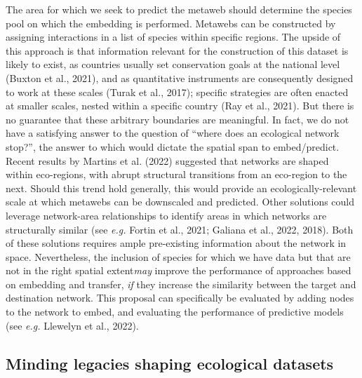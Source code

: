 \documentclass[11pt]{article}
\begin{document}
The area for which we seek to predict the metaweb should determine the
species pool on which the embedding is performed. Metawebs can be
constructed by assigning interactions in a list of species within
specific regions. The upside of this approach is that information
relevant for the construction of this dataset is likely to exist, as
countries usually set conservation goals at the national level (Buxton
et al., 2021), and as quantitative instruments are consequently designed
to work at these scales (Turak et al., 2017); specific strategies are
often enacted at smaller scales, nested within a specific country (Ray
et al., 2021). But there is no guarantee that these arbitrary boundaries
are meaningful. In fact, we do not have a satisfying answer to the
question of ``where does an ecological network stop?'', the answer to
which would dictate the spatial span to embed/predict. Recent results by
Martins et al. (2022) suggested that networks are shaped within
eco-regions, with abrupt structural transitions from an eco-region to
the next. Should this trend hold generally, this would provide an
ecologically-relevant scale at which metawebs can be downscaled and
predicted. Other solutions could leverage network-area relationships to
identify areas in which networks are structurally similar (see
\emph{e.g.} Fortin et al., 2021; Galiana et al., 2022, 2018). Both of
these solutions requires ample pre-existing information about the
network in space. Nevertheless, the inclusion of species for which we
have data but that are not in the right spatial extent\emph{may} improve
the performance of approaches based on embedding and transfer, \emph{if}
they increase the similarity between the target and destination network.
This proposal can specifically be evaluated by adding nodes to the
network to embed, and evaluating the performance of predictive models
(see \emph{e.g.} Llewelyn et al., 2022).

\hypertarget{minding-legacies-shaping-ecological-datasets}{%
\subsection{Minding legacies shaping ecological
datasets}\label{minding-legacies-shaping-ecological-datasets}}
\end{document}
